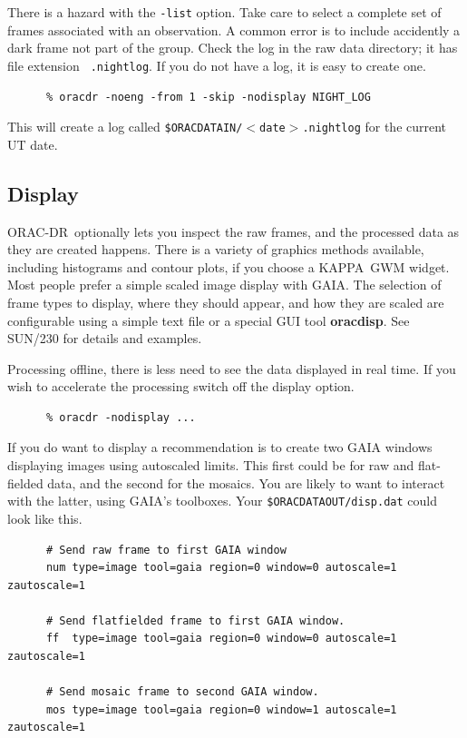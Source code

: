 \documentclass[twoside,11pt]{article}
\newcommand{\xref}[3]{#1}
\newcommand{\xlabel}[1]{}
\renewcommand{\_}{\texttt{\symbol{95}}}
\newcommand{\GAIA}{{\footnotesize GAIA}}
\newcommand{\KAPPA}{{\footnotesize KAPPA}}
\newcommand{\ORACDR}{{\footnotesize ORAC-DR}}
\begin{document}
There is a hazard with the {\tt -list} option.  Take care to select a
complete set of frames associated with an observation.  A common error
is to include accidently a dark frame not part of the group.  Check
the log in the raw data directory; it has file extension {\tt
.nightlog}.  If you do not have a log, it is easy to create one.

\begin{verbatim}
      % oracdr -noeng -from 1 -skip -nodisplay NIGHT_LOG
\end{verbatim}
This will create a log called {\tt \$ORAC\_DATA\_IN/$<$date$>$.nightlog}
for the current UT date.

\subsection{\xlabel{display}Display\label{display}}

\ORACDR\ optionally lets you inspect the raw frames, and the processed 
data as they are created happens.  There is a variety 
of graphics methods available, including histograms and contour plots,
if you choose a \KAPPA\ GWM widget.  Most people prefer a simple scaled
image display with \GAIA.  The selection of frame types to display, 
where they should appear, and how they are scaled are configurable
using a simple text file or a special GUI tool {\bf oracdisp}.  See
\xref{SUN/230}{sun230}{display_system} for details and examples.

Processing offline, there is less need to see the data displayed in real time.
If you wish to accelerate the processing switch off the display option.

\begin{verbatim}
      % oracdr -nodisplay ...
\end{verbatim}

If you do want to display a recommendation is to create two GAIA windows
displaying images using autoscaled limits.  This first could be for
raw and flat-fielded data, and the second for the mosaics.  You are
likely to want to interact with the latter, using \GAIA's toolboxes.
Your {\tt \$ORAC\_DATA\_OUT/disp.dat} could look like this.

\begin{verbatim}
      # Send raw frame to first GAIA window 
      num type=image tool=gaia region=0 window=0 autoscale=1 zautoscale=1

      # Send flatfielded frame to first GAIA window.
      ff  type=image tool=gaia region=0 window=0 autoscale=1 zautoscale=1

      # Send mosaic frame to second GAIA window.
      mos type=image tool=gaia region=0 window=1 autoscale=1 zautoscale=1
\end{verbatim}
\end{document}
